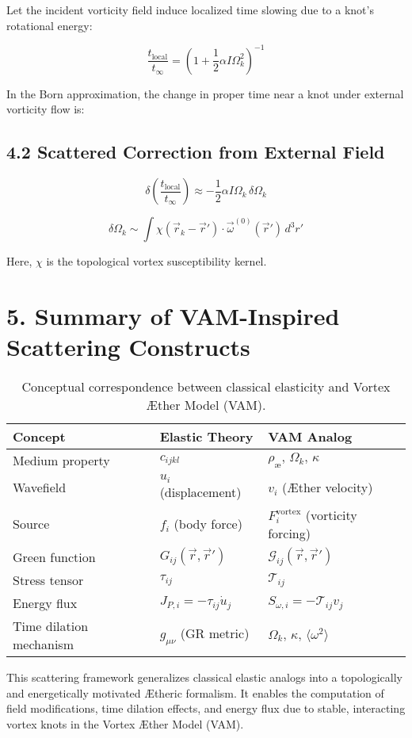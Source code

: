 Let the incident vorticity field induce localized time slowing due to a knot’s rotational energy:

\[
\frac{t_{\text{local}}}{t_{\infty}} = \left(1 + \frac{1}{2} \alpha I \Omega_k^2 \right)^{-1}
\]

In the Born approximation, the change in proper time near a knot under external vorticity flow is:

\subsection*{4.2 Scattered Correction from External Field}

\[
\delta \left( \frac{t_{\text{local}}}{t_{\infty}} \right) \approx - \frac{1}{2} \alpha I \Omega_k \, \delta \Omega_k
\]

\[
\delta \Omega_k \sim \int \chi(\vec{r}_k - \vec{r}') \cdot \vec{\omega}^{(0)}(\vec{r}') \, d^3r'
\]

Here, \(\chi\) is the topological vortex susceptibility kernel.



\section*{5. Summary of VAM-Inspired Scattering Constructs}


\begin{table}[h!]
    \centering
    \begin{tabular}{lll}
        \toprule
        \textbf{Concept} & \textbf{Elastic Theory} & \textbf{VAM Analog} \\
        \midrule
        Medium property & \( c_{ijkl} \) & \( \rho_{\text{\ae}},\, \Omega_k,\, \kappa \) \\
        Wavefield & \( u_i \) (displacement) & \( v_i \) (Æther velocity) \\
        Source & \( f_i \) (body force) & \( F_i^{\text{vortex}} \) (vorticity forcing) \\
        Green function & \( G_{ij}(\vec{r}, \vec{r}') \) & \( \mathcal{G}_{ij}(\vec{r}, \vec{r}') \) \\
        Stress tensor & \( \tau_{ij} \) & \( \mathcal{T}_{ij} \) \\
        Energy flux & \( J_{P,i} = -\tau_{ij} \dot{u}_j \) & \( S_{\omega,i} = -\mathcal{T}_{ij} v_j \) \\
        Time dilation mechanism & \( g_{\mu\nu} \) (GR metric) & \( \Omega_k,\, \kappa,\, \langle \omega^2 \rangle \) \\
        \bottomrule
    \end{tabular}
    \caption{Conceptual correspondence between classical elasticity and Vortex Æther Model (VAM).}
    \label{tab:elastic-vam-analogy}
\end{table}



This scattering framework generalizes classical elastic analogs into a topologically and energetically motivated Ætheric formalism. It enables the computation of field modifications, time dilation effects, and energy flux due to stable, interacting vortex knots in the Vortex Æther Model (VAM).